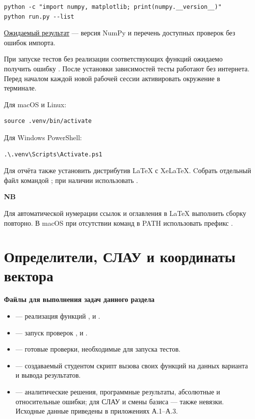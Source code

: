 \documentclass[12pt,a4paper]{article}
\newcommand{\taskhead}[1]{\par\textbf{#1}\par}
\newenvironment{notabene}
  {\par\medskip
   \begin{lrbox}{\nbbox}%
   \begin{minipage}{\dimexpr\linewidth-20pt\relax}
   {\fontsize{13}{16}\selectfont\bfseries
    \color{black!85}NB\par}
   \vspace{4pt}
   \noindent\ignorespaces}
  {\par\end{minipage}%
   \end{lrbox}%
   \noindent
   \begingroup
   \setlength{\fboxsep}{10pt}%
   \colorbox{blue!5}{\usebox{\nbbox}}%
   \endgroup
   \par\medskip}
\begin{document}
\begin{lstlisting}[style=commands]
python -c "import numpy, matplotlib; print(numpy.__version__)"
python run.py --list
\end{lstlisting}

\underline{Ожидаемый результат} --- версия NumPy и перечень доступных проверок без ошибок импорта.

При запуске тестов без реализации соответствующих функций ожидаемо получить ошибку . После установки зависимостей тесты работают
без интернета. Перед началом каждой новой рабочей сессии активировать окружение в терминале.

Для macOS и Linux:

\begin{lstlisting}[style=commands]
source .venv/bin/activate
\end{lstlisting}

Для Windows PowerShell:

\begin{lstlisting}[style=commands]
.\.venv\Scripts\Activate.ps1
\end{lstlisting}

Для отчёта также установить дистрибутив LaTeX с XeLaTeX. Cобрать отдельный
файл  командой ; при наличии
 использовать .


\begin{notabene}
Для автоматической нумерации ссылок и оглавления в LaTeX выполнить сборку повторно.
В macOS при отсутствии команд в PATH использовать префикс
.
\end{notabene}

\newpage

\section{Определители, СЛАУ и координаты вектора}
\taskhead{Файлы для выполнения задач данного раздела}
\begin{itemize}
\item {} --- реализация функций ,  и .
\item {} --- запуск проверок ,  и .
\item {} --- готовые проверки, необходимые для запуска тестов.
\item {} --- создаваемый студентом скрипт вызова своих функций на данных варианта и вывода результатов.
\item {} --- аналитические решения, программные результаты, абсолютные и относительные ошибки; для СЛАУ и смены базиса --- также невязки. Исходные данные приведены в приложениях А.1--А.3.
\end{itemize}
\end{document}
